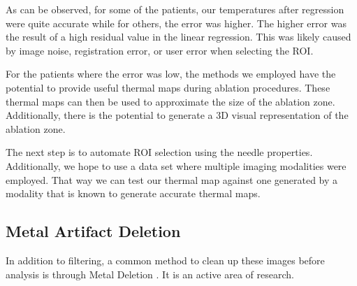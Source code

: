 \documentclass[]{spie}  %
\begin{document}
As can be observed, for some of the patients, our temperatures after regression were quite accurate while for others, the error was higher. The higher error was the result of a high residual value in the linear regression. This was likely caused by image noise, registration error, or user error when selecting the ROI. 

For the patients where the error was low, the methods we employed have the potential to provide useful thermal maps during ablation procedures. These thermal maps can then be used to approximate the size of the ablation zone. Additionally, there is the potential to generate a 3D visual representation of the ablation zone. 

The next step is to automate ROI selection using the needle properties. Additionally, we hope to use a data set where multiple imaging modalities were employed. That way we can test our thermal map against one generated by a modality that is known to generate accurate thermal maps. 

\subsection{Metal Artifact Deletion}

In addition to filtering, a common method to clean up these images before analysis is through Metal Deletion \cite{Boas11}. It is an active area of research.



\end{document}
